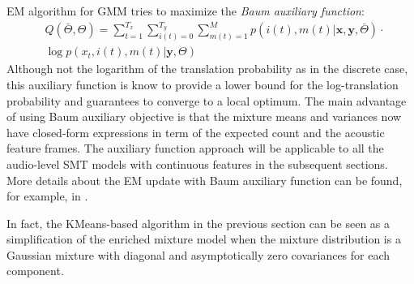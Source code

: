 \documentclass[journal]{IEEEtran}
\begin{document}
EM algorithm for GMM tries to maximize the \textit{Baum auxiliary function}:
\begin{align}\label{eq:multimodal_gmm_objective}
&Q(\bar{\Theta}, \Theta) = \sum_{t=1}^{T_x}\sum_{i(t)=0}^{T_y}\sum_{m(t)=1}^M p(i(t), m(t)|\mathbf x, \mathbf y, \bar {\Theta}) \cdot \nonumber\\
&\log p(x_t, i(t), m(t)| \mathbf y, \Theta)
\end{align}
Although not the logarithm of the translation probability as in the discrete case, this auxiliary function is know to provide a lower bound for the log-translation probability and guarantees to converge to a local optimum. The main advantage of using Baum auxiliary objective is that the mixture means and variances now have closed-form expressions in term of the expected count and the acoustic feature frames. The auxiliary function approach will be applicable to all the audio-level SMT models with continuous features in the subsequent sections. More details about the EM update with Baum auxiliary function can be found, for example, in \cite{Bilmes2001}. 

In fact, the KMeans-based algorithm in the previous section can be seen as a simplification of the enriched mixture model when the mixture distribution is a Gaussian mixture with diagonal and asymptotically zero covariances for each component. 


\end{document}
